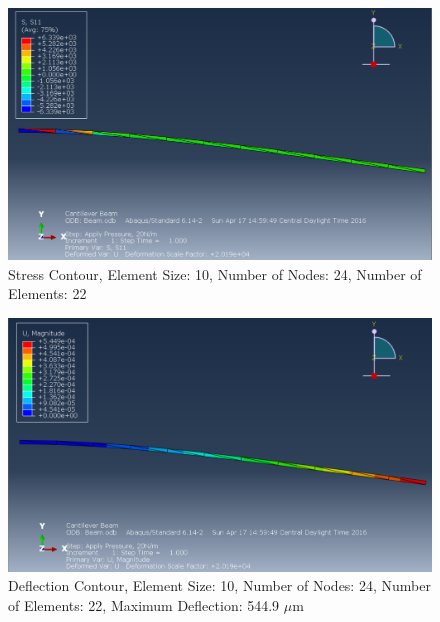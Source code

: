 \documentclass[a4paper]{article}
\begin{document}
\begin{figure}[ht]
\centering
\includegraphics[scale=.50]{3Nsize10Stress.PNG}
\caption{Stress Contour, Element Size: 10, Number of Nodes: 24, Number of Elements: 22}
\end{figure}
\begin{figure}[ht]
\centering
\includegraphics[scale=.50]{3Nsize10MDisplacement.PNG}
\caption{Deflection Contour, Element Size: 10, Number of Nodes: 24, Number of Elements: 22, Maximum Deflection: 544.9 $\mu$m}
\end{figure}
\end{document}
